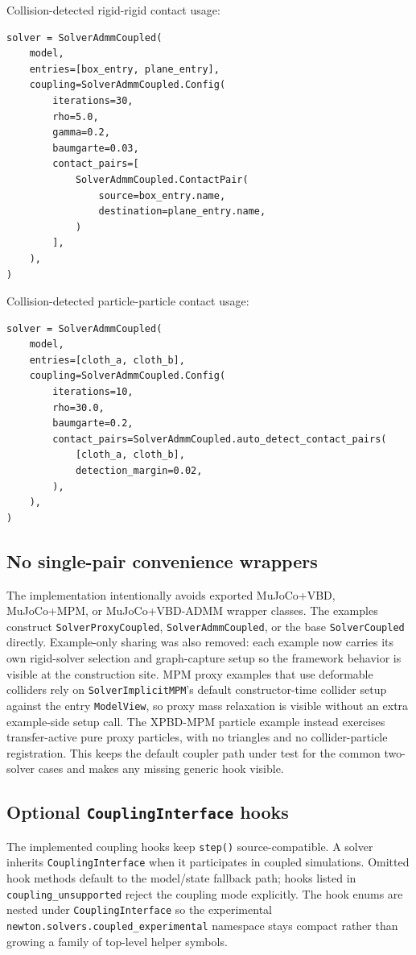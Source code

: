 \documentclass[11pt]{article}
\begin{document}
Collision-detected rigid-rigid contact usage:
\begin{verbatim}
solver = SolverAdmmCoupled(
    model,
    entries=[box_entry, plane_entry],
    coupling=SolverAdmmCoupled.Config(
        iterations=30,
        rho=5.0,
        gamma=0.2,
        baumgarte=0.03,
        contact_pairs=[
            SolverAdmmCoupled.ContactPair(
                source=box_entry.name,
                destination=plane_entry.name,
            )
        ],
    ),
)
\end{verbatim}

Collision-detected particle-particle contact usage:
\begin{verbatim}
solver = SolverAdmmCoupled(
    model,
    entries=[cloth_a, cloth_b],
    coupling=SolverAdmmCoupled.Config(
        iterations=10,
        rho=30.0,
        baumgarte=0.2,
        contact_pairs=SolverAdmmCoupled.auto_detect_contact_pairs(
            [cloth_a, cloth_b],
            detection_margin=0.02,
        ),
    ),
)
\end{verbatim}

\subsection{No single-pair convenience wrappers}

The implementation intentionally avoids exported MuJoCo+VBD, MuJoCo+MPM, or
MuJoCo+VBD-ADMM wrapper classes. The examples construct
\texttt{SolverProxyCoupled}, \texttt{SolverAdmmCoupled}, or the base
\texttt{SolverCoupled} directly.  Example-only sharing was also removed: each
example now carries its own rigid-solver selection and graph-capture setup so
the framework behavior is visible at the construction site.  MPM proxy examples
that use deformable colliders rely on \texttt{SolverImplicitMPM}'s default
constructor-time collider setup against the entry \texttt{ModelView}, so proxy
mass relaxation is visible without an extra example-side setup call. The
XPBD-MPM particle example instead exercises transfer-active pure proxy particles,
with no triangles and no collider-particle registration. This keeps the default
coupler path under test for the common two-solver cases and makes any missing
generic hook visible.

\subsection{Optional \texttt{CouplingInterface} hooks}

The implemented coupling hooks keep \texttt{step()} source-compatible. A solver
inherits \texttt{CouplingInterface} when it participates in coupled simulations.
Omitted hook methods default to the model/state fallback path; hooks listed in
\texttt{coupling\_unsupported} reject the coupling mode explicitly. The hook
enums are nested under \texttt{CouplingInterface} so the experimental
\texttt{newton.solvers.coupled\_experimental} namespace stays compact rather
than growing a family of top-level helper symbols.
\end{document}
